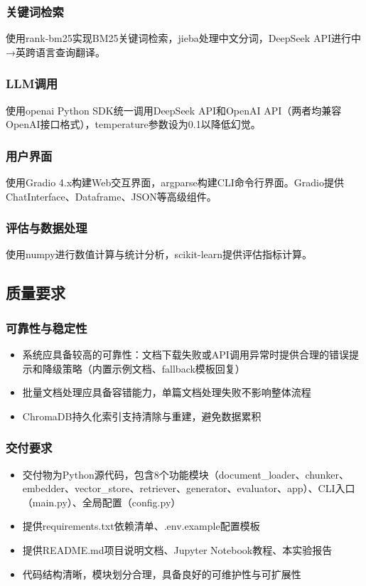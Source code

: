 \documentclass[10pt,a4paper]{article}
\begin{document}
\subsubsection{关键词检索}
使用rank-bm25实现BM25关键词检索，jieba处理中文分词，DeepSeek API进行中→英跨语言查询翻译。

\subsubsection{LLM调用}
使用openai Python SDK统一调用DeepSeek API和OpenAI API（两者均兼容OpenAI接口格式），temperature参数设为0.1以降低幻觉。

\subsubsection{用户界面}
使用Gradio 4.x构建Web交互界面，argparse构建CLI命令行界面。Gradio提供ChatInterface、Dataframe、JSON等高级组件。

\subsubsection{评估与数据处理}
使用numpy进行数值计算与统计分析，scikit-learn提供评估指标计算。

\subsection{质量要求}

\subsubsection{可靠性与稳定性}
\begin{itemize}
\item 系统应具备较高的可靠性：文档下载失败或API调用异常时提供合理的错误提示和降级策略（内置示例文档、fallback模板回复）
\item 批量文档处理应具备容错能力，单篇文档处理失败不影响整体流程
\item ChromaDB持久化索引支持清除与重建，避免数据累积
\end{itemize}

\subsubsection{交付要求}
\begin{itemize}
\item 交付物为Python源代码，包含8个功能模块（document\_loader、chunker、embedder、vector\_store、retriever、generator、evaluator、app）、CLI入口（main.py）、全局配置（config.py）
\item 提供requirements.txt依赖清单、.env.example配置模板
\item 提供README.md项目说明文档、Jupyter Notebook教程、本实验报告
\item 代码结构清晰，模块划分合理，具备良好的可维护性与可扩展性
\end{itemize}
\end{document}
